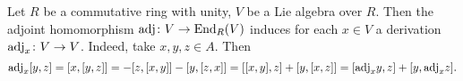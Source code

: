\begin{example}
  Let $R$ be a commutative ring with unity,
  $V$ be a Lie algebra over $R$.
  Then the adjoint homomorphism ${\rm adj} \colon V \to {\rm End}_R(V)$ induces
  for each $x \in V$ a derivation ${\rm adj}_x \colon V \to V$.
  Indeed, take $x, y, z \in A$.
  Then
  \begin{equation}
    {\rm adj}_x [y, z]
    = [x, [y, z]]
    = - [z, [x, y]] - [y, [z, x]]
    = [[x, y], z] + [y, [x, z]]
    = [{\rm adj}_x y, z] + [y, {\rm adj}_x z].
  \end{equation}
\end{example}
